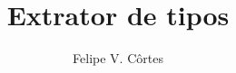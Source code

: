 \documentclass[mscr,american]{thesispuc}%
\author{Felipe V. Côrtes}
\title{Extrator de tipos} %
\begin{document}
  
  
  
  \arial
   
\end{document}
